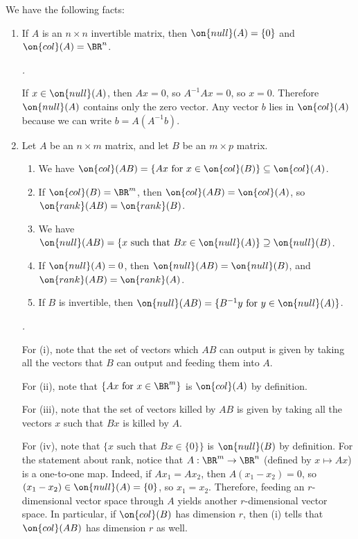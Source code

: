 \documentclass[10pt]{amsart}
\makeatletter
\renewenvironment{proof}[1][\proofname]{\par
	\pushQED{\qed}%
	\normalfont \topsep6\p@\@plus6\p@\relax
	\noindent\emph{#1.} 
	\ignorespaces
}{%
\popQED\endtrivlist\@endpefalse
}
\theoremstyle{mythm}
\theoremstyle{definition}
\theoremstyle{myrmk}
\newenvironment{myproof}{\color{blue}\begin{proof}}{\end{proof}}
\makeatother
\begin{document}
	We have the following facts: 
	\begin{enumerate}[label=(\arabic*)]
		\item If $A$ is an $n \times n$ invertible matrix, then $\on{null}(A) = \{0\}$ and $\on{col}(A) = \BR^n$. 
		\begin{myproof}
			If $x \in \on{null}(A)$, then $Ax = 0$, so $A^{-1}Ax = 0$, so $x = 0$. Therefore $\on{null}(A)$ contains only the zero vector. Any vector $b$ lies in $\on{col}(A)$ because we can write $b = A(A^{-1}b)$. 
		\end{myproof}
		\item Let $A$ be an $n \times m$ matrix, and let $B$ be an $m \times p$ matrix. 
		\begin{enumerate}[label=(\roman*)]
			\item We have $\on{col}(AB) = \{Ax \text{ for } x \in \on{col}(B)\} \subseteq \on{col}(A)$. 
			\item If $\on{col}(B) = \BR^m$, then $\on{col}(AB) = \on{col}(A)$, so $\on{rank}(AB) = \on{rank}(B)$. 
			\item We have $\on{null}(AB) = \{x \text{ such that } Bx \in \on{null}(A)\} \supseteq \on{null}(B)$. 
			\item If $\on{null}(A) = 0$, then $\on{null}(AB) = \on{null}(B)$, and $\on{rank}(AB) = \on{rank}(A)$. 
			\item If $B$ is invertible, then $\on{null}(AB) = \{B^{-1}y \text{ for } y \in \on{null}(A)\}$. 
		\end{enumerate}
		\begin{myproof}
			For (i), note that the set of vectors which $AB$ can output is given by taking all the vectors that $B$ can output and feeding them into $A$. 
			
			For (ii), note that $\{Ax \text{ for } x \in \BR^m\}$ is $\on{col}(A)$ by definition. 
			
			For (iii), note that the set of vectors killed by $AB$ is given by taking all the vectors $x$ such that $Bx$ is killed by $A$. 
			
			For (iv), note that $\{x \text{ such that } Bx \in \{0\}\}$ is $\on{null}(B)$ by definition. For the statement about rank, notice that $A : \BR^m \to \BR^n$ (defined by $x \mapsto Ax$) is a one-to-one map. Indeed, if $Ax_1 = Ax_2$, then $A(x_1 - x_2) = 0$, so $(x_1 - x_2) \in \on{null}(A) = \{0\}$, so $x_1 = x_2$. Therefore, feeding an $r$-dimensional vector space through $A$ yields another $r$-dimensional vector space. In particular, if $\on{col}(B)$ has dimension $r$, then (i) tells that $\on{col}(AB)$ has dimension $r$ as well. 
			

\end{myproof}
\end{enumerate}
\end{document}
